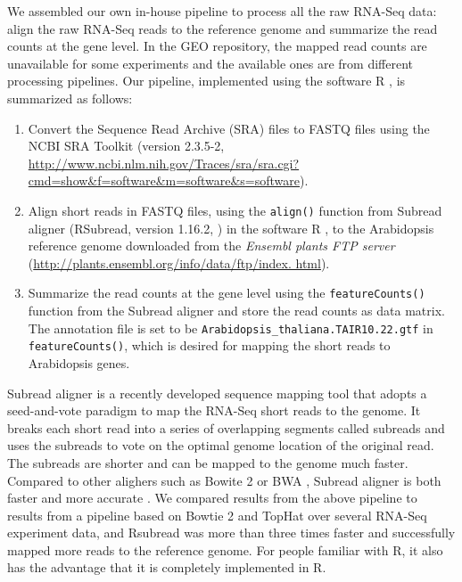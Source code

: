 \documentclass[11pt, a4paper]{article}
\begin{document}
 
We assembled our own in-house pipeline to process all the raw RNA-Seq data:
align the raw RNA-Seq reads to the reference genome and summarize the read counts at the 
gene level. In the GEO repository, the
mapped read counts are unavailable for some experiments and the available ones
are from different processing pipelines.  
Our pipeline, implemented using the software R \citep{Rpackage}, is summarized as follows: 
\begin{enumerate}
    \item Convert the Sequence Read Archive (SRA) files to FASTQ files using the NCBI SRA Toolkit (version 2.3.5-2,  \url{http://www.ncbi.nlm.nih.gov/Traces/sra/sra.cgi?cmd=show&f=software&m=software&s=software}). 
    \item
	Align short reads in FASTQ files,  using the \verb|align()| function from 
	Subread aligner (RSubread, version 1.16.2, \citealt{liao2013subread}) in the software R
	\citep{ Rpackage}, to the Arabidopsis reference genome
	downloaded from the \textit{ Ensembl plants FTP server} (\url{http://plants.ensembl.org/info/data/ftp/index. html}). 
	

 \item
     Summarize the read counts at the gene level using the \verb|featureCounts()| function from the
     Subread aligner
     and store the read counts as data matrix.  
     The annotation file is set to be \verb"Arabidopsis_thaliana.TAIR10.22.gtf" in
     \verb|featureCounts()|, which is desired for mapping the short reads to
     Arabidopsis genes. %
\end{enumerate}
Subread aligner is a recently developed sequence mapping tool that adopts a
seed-and-vote paradigm to map the RNA-Seq short reads to the genome. 
It breaks each short read into a series of overlapping segments called
subreads and uses the subreads to vote on the optimal genome location of the
original read. The subreads are shorter and can be mapped to the genome much
faster.
Compared to other alighers such as Bowite 2 \citep{langmead2012fast} or BWA
\citep{li2009fast}, Subread aligner is both faster and more accurate
\citep{liao2013subread}. We compared results from the above
pipeline to results from a pipeline based on Bowtie 2 and TopHat
\citep{trapnell2009tophat} over several RNA-Seq experiment data, and Rsubread
was more than three times faster and successfully mapped more reads to the
reference genome.  For people familiar with R, it also has the advantage
that it is completely implemented in R.
\end{document}
